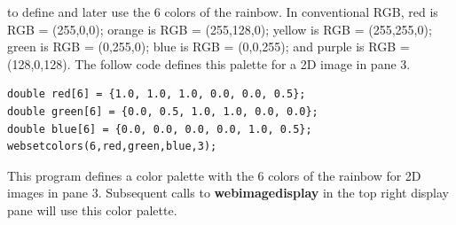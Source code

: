 to define and later use the 6 colors of the rainbow. In conventional RGB, red is RGB = (255,0,0); orange is 
RGB = (255,128,0); yellow is RGB = (255,255,0); green is RGB = (0,255,0); blue is RGB = (0,0,255); and purple
is RGB = (128,0,128). The follow code defines this palette for a 2D image in pane 3.
\begin{verbatim}
double red[6] = {1.0, 1.0, 1.0, 0.0, 0.0, 0.5};
double green[6] = {0.0, 0.5, 1.0, 1.0, 0.0, 0.0};
double blue[6] = {0.0, 0.0, 0.0, 0.0, 1.0, 0.5};
websetcolors(6,red,green,blue,3); 
\end{verbatim}
This program defines a color palette with the 6 colors of the rainbow for 2D images in pane 3. Subsequent calls to 
\textbf{webimagedisplay} in the top right display pane will use this color palette.

\newpage
